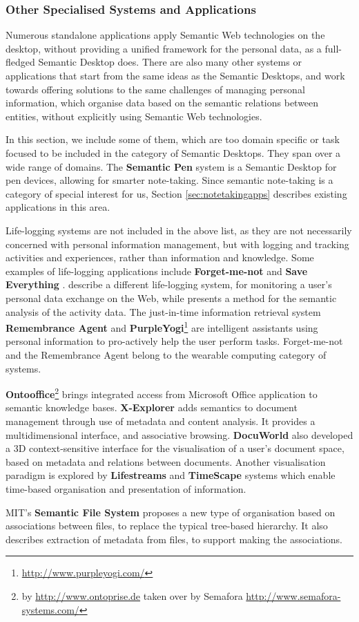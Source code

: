 \subsubsection{Other Specialised Systems and Applications}

Numerous standalone applications apply Semantic Web technologies on the desktop, without providing a unified framework for the personal data, as a full-fledged Semantic Desktop does. There are also many other systems or applications that start from the same ideas as the Semantic Desktops, and work towards offering solutions to the same challenges of managing personal information, which organise data based on the semantic relations between entities, without explicitly using Semantic Web technologies. 

In this section, we include some of them, which are too domain specific or task focused to be included in the category of Semantic Desktops. They span over a wide range of domains. The \textbf{Semantic Pen} \cite{Varadarajan2005} system is a Semantic Desktop for pen devices, allowing for smarter note-taking. Since semantic note-taking is a category of special interest for us,  Section \ref{sec:notetakingapps} describes existing applications in this area.

Life-logging systems are not included in the above list, as they are not necessarily concerned with personal information management, but with logging and tracking activities and experiences, rather than information and knowledge. Some examples of life-logging applications include \textbf{Forget-me-not} \cite{Lamming1994} and \textbf{Save Everything} \cite{Hull2001}. \cite{DAquin2010,DAquin2011a} describe a different life-logging system, for monitoring a user's personal data exchange on the Web, while \cite{DAquin2011b} presents a method for the semantic analysis of the activity data.
The just-in-time information retrieval system \textbf{Remembrance Agent} \cite{Rhodes1996} and \textbf{PurpleYogi}\footnote{\url{http://www.purpleyogi.com/}} are intelligent assistants using personal information to pro-actively help the user perform tasks. Forget-me-not and the Remembrance Agent belong to the wearable computing category of systems.

\textbf{Ontooffice}\footnote{by \url{http://www.ontoprise.de} taken over by Semafora \url{http://www.semafora-systems.com/}} brings integrated access from Microsoft Office application to semantic knowledge bases. \textbf{X-Explorer} \cite{Wang2005} adds semantics to document management through use of metadata and content analysis. It provides a multidimensional interface, and associative browsing. \textbf{DocuWorld} \cite{Einsfeld2005} also developed a 3D context-sensitive interface for the visualisation of a user's document space, based on metadata and relations between documents. Another visualisation paradigm is explored by \textbf{Lifestreams} and \textbf{TimeScape} systems which enable time-based organisation and presentation of information.

MIT's \textbf{Semantic File System} \cite{Gifford1991} proposes a new type of organisation based on associations between files, to replace the typical tree-based hierarchy. It also describes extraction of metadata from files, to support making the associations.
